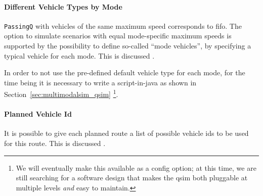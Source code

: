 \paragraph{Different Vehicle Types by Mode}
\lstinline|PassingQ| with vehicles of the same maximum speed corresponds to \gls{fifo}. 
The option to simulate scenarios with equal mode-specific maximum speeds is supported by the possibility to define so-called ``mode vehicles'', \ie by specifying a typical vehicle for each mode.
%
This is discussed .
%  
%
%
%

In order to not use the pre-defined default vehicle type for each mode, for the time being it is necessary to write a script-in-\gls{java} as shown in Section~\ref{sec:multimodalsim_qsim}
\footnote{We will eventually make this available as a config option; at this time, we are still searching for a software design that makes the \gls{qsim} both pluggable at multiple levels \emph{and} easy to maintain.}.


\paragraph{Planned Vehicle Id}
It is possible to give each planned route a list of possible vehicle \glspl{id} to be used for this route.  
This is discussed .

